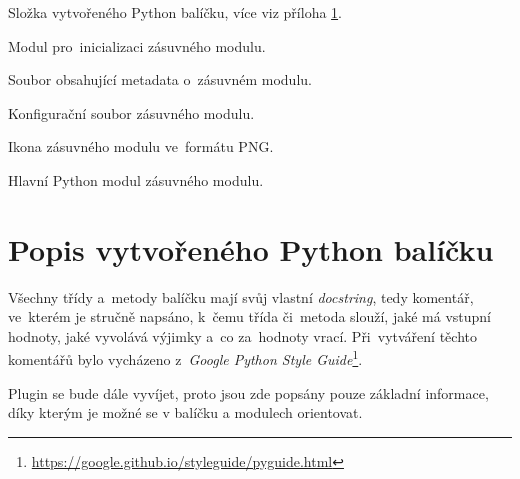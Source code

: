 \begin{description}
\begin{description}[leftmargin=1cm]
\begin{description}[leftmargin=1cm]
		\end{description}
	\end{description}
	\item[\texttt{pubin}:] Složka vytvořeného Python balíčku, více viz příloha \ref{popis_python_balicku}.
	\item[\texttt{\detokenize{__init__.py}}:] Modul pro~inicializaci zásuvného modulu.
	\item[\texttt{metadata.txt}:] Soubor obsahující metadata o~zásuvném modulu.
	\item[\texttt{puplugin.cfg}:] Konfigurační soubor zásuvného modulu.
	\item[\texttt{puplugin.png}:] Ikona zásuvného modulu ve~formátu PNG.
	\item[\texttt{puplugin.py}:] Hlavní Python modul zásuvného modulu.
\end{description}

\chapter{Popis vytvořeného Python balíčku}
\label{popis_python_balicku}

Všechny třídy a~metody balíčku mají svůj vlastní \textit{docstring}, tedy komentář, ve~kterém je stručně napsáno, k~čemu třída či~metoda slouží, jaké má vstupní hodnoty, jaké vyvolává výjimky a~co za~hodnoty vrací. Při~vytváření těchto komentářů bylo vycházeno z~\textit{Google Python Style Guide}\footnote{\url{https://google.github.io/styleguide/pyguide.html}}.

Plugin se bude dále vyvíjet, proto jsou zde popsány pouze základní informace, díky kterým je možné se v balíčku a modulech orientovat.

\bigskip

\begin{minipage}{0.9\textwidth}
\end{minipage}

